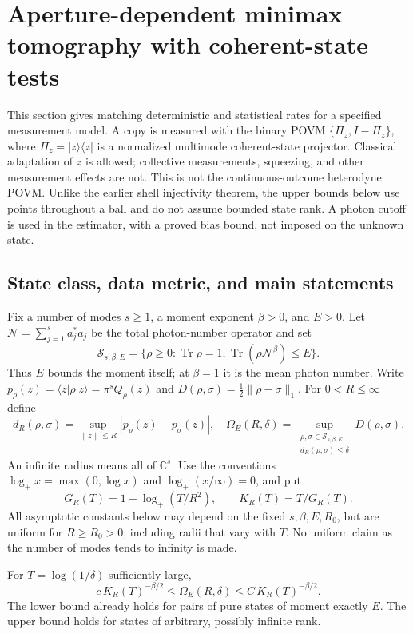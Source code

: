 \section{Aperture-dependent minimax tomography with coherent-state tests}
\label{sec:coherent-aperture}
This section gives matching deterministic and statistical rates for a specified
measurement model. A copy is measured with the binary POVM
$\{\Pi_z,I-\Pi_z\}$, where $\Pi_z=|z\rangle\langle z|$ is a normalized
multimode coherent-state projector. Classical adaptation of $z$ is allowed;
collective measurements, squeezing, and other measurement effects are not.
This is not the continuous-outcome heterodyne POVM. Unlike the earlier shell
injectivity theorem, the upper bounds below use points throughout a ball and
do not assume bounded state rank. A photon cutoff is used in the estimator,
with a proved bias bound, not imposed on the unknown state.

\subsection{State class, data metric, and main statements}
Fix a number of modes $s\ge1$, a moment exponent $\beta>0$, and $E>0$. Let
$\mathcal N=\sum_{j=1}^s a_j^*a_j$ be the total photon-number operator and set
\[
 \mathcal S_{s,\beta,E}
 =\{\rho\ge0:\operatorname{Tr}\rho=1,
                    \operatorname{Tr}(\rho\mathcal N^\beta)\le E\}.
\]
Thus $E$ bounds the moment itself; at $\beta=1$ it is the mean photon number.
Write $p_\rho(z)=\langle z|\rho|z\rangle=\pi^sQ_\rho(z)$ and
$D(\rho,\sigma)=\tfrac12\|\rho-\sigma\|_1$.
For $0<R\le\infty$ define
\[
 d_R(\rho,\sigma)=\sup_{\|z\|\le R}|p_\rho(z)-p_\sigma(z)|,
 \quad
 \Omega_E(R,\delta)=\sup_{\substack{\rho,\sigma\in\mathcal S_{s,\beta,E}\\
                                  d_R(\rho,\sigma)\le\delta}}
                                  D(\rho,\sigma).
\]
An infinite radius means all of $\mathbb C^s$. Use the conventions
$\log_+ x=\max(0,\log x)$ and $\log_+(x/\infty)=0$, and put
\[
 G_R(T)=1+\log_+(T/R^2),\qquad K_R(T)=T/G_R(T).
 \tag{A.1}\label{eq:aperture-scale}
\]
All asymptotic constants below may depend on the fixed $s,\beta,E,R_0$,
but are uniform for $R\ge R_0>0$, including radii that vary with $T$.
No uniform claim as the number of modes tends to infinity is made.

\begin{theorem}
\label{thm:aperture-modulus}
For $T=\log(1/\delta)$ sufficiently large,
\[
 \boxed{\quad
 c\,K_R(T)^{-\beta/2}
 \le\Omega_E(R,\delta)\le C\,K_R(T)^{-\beta/2}.
 \quad}
 \tag{A.2}\label{eq:aperture-modulus}
\]
The lower bound already holds for pairs of pure states of moment exactly $E$.
The upper bound holds for states of arbitrary, possibly infinite rank.
\end{theorem}

